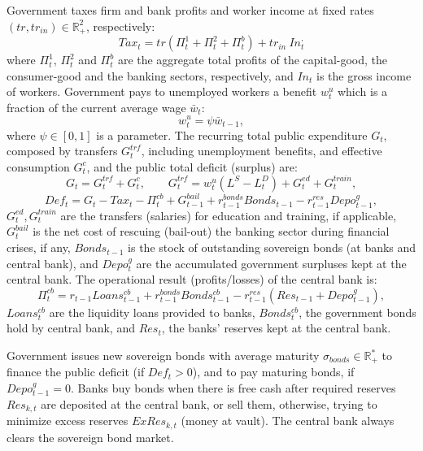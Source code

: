 \documentclass[a4paper,11pt]{article}
\begin{document}
\begin{appendices}
Government taxes firm and bank profits and worker income at fixed rates $(tr, {tr}_{in}) \in \mathbb{R}_+^2$, respectively:
\begin{equation}
	Tax_t = tr \left( \Pi_t^1 + \Pi_t^2 + \Pi_t^b \right) + {tr}_{in} ~ In_t^,
\end{equation}
where $\Pi_t^1$, $\Pi_t^2$ and $\Pi_t^b$ are the aggregate total profits of the capital-good, the consumer-good and the banking sectors, respectively, and $In_t$ is the gross income of workers. Government pays to unemployed workers a benefit $w_t^u$ which is a fraction of the current average wage $\bar{w}_{t}$:
\begin{equation}
	w_t^u= \psi \bar{w}_{t-1},
\end{equation}
where $\psi \in [0,1]$ is a parameter. The recurring total public expenditure $G_t$, composed by transfers $G_t^{trf}$, including unemployment benefits, and effective consumption $G_t^c$, and the public total deficit (surplus) are:
\begin{equation}
	G_t = G_t^{trf} + G_t^c,
	\qquad G_t^{trf} = w_t^u \left( L^S-L^D_t \right) + G_t^{ed} + G_t^{train},
\end{equation}
\begin{equation}
	Def_t = G_t - Tax_t - \Pi_t^{cb} + G_{t-1}^{bail} + r_{t-1}^{bonds} Bonds_{t-1} - r_{t-1}^{res} Depo_{t-1}^g,
\end{equation}
$G_t^{ed}, G_t^{train}$ are the transfers (salaries) for education and training, if applicable, $G_t^{bail}$ is the net cost of rescuing (bail-out) the banking sector during financial crises, if any, $Bonds_{t-1}$ is the stock of outstanding sovereign bonds (at banks and central bank), and $Depo_{t}^g$ are the accumulated government surpluses kept at the central bank. The operational result (profits/losses) of the central bank is:
\begin{equation}
	\Pi_t^{cb} = r_{t-1} Loans_{t-1}^{cb} + r_{t-1}^{bonds} Bonds_{t-1}^{cb} - r_{t-1}^{res} \left( Res_{t-1} + Depo_{t-1}^g \right),
\end{equation}
$Loans_t^{cb}$ are the liquidity loans provided to banks, $Bonds_t^{cb}$, the government bonds hold by central bank, and $Res_{t}$, the banks' reserves kept at the central bank.

Government issues new sovereign bonds with average maturity $\sigma_{bonds} \in \mathbb{R}^*_+$ to finance the public deficit (if $Def_t > 0$), and to pay maturing bonds, if $Depo_{t-1}^g = 0$. Banks buy bonds when there is free cash after required reserves $Res_{k,t}$ are deposited at the central bank, or sell them, otherwise, trying to minimize excess reserves $ExRes_{k,t}$ (money at vault). The central bank always clears the sovereign bond market.


\end{appendices}
\end{document}
